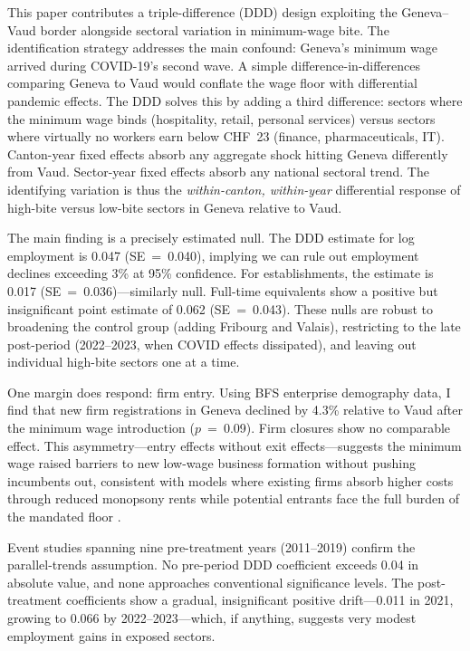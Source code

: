 \documentclass[12pt]{article}
\begin{document}
This paper contributes a triple-difference (DDD) design exploiting the Geneva--Vaud border alongside sectoral variation in minimum-wage bite. The identification strategy addresses the main confound: Geneva's minimum wage arrived during COVID-19's second wave. A simple difference-in-differences comparing Geneva to Vaud would conflate the wage floor with differential pandemic effects. The DDD solves this by adding a third difference: sectors where the minimum wage binds (hospitality, retail, personal services) versus sectors where virtually no workers earn below CHF~23 (finance, pharmaceuticals, IT). Canton-year fixed effects absorb any aggregate shock hitting Geneva differently from Vaud. Sector-year fixed effects absorb any national sectoral trend. The identifying variation is thus the \textit{within-canton, within-year} differential response of high-bite versus low-bite sectors in Geneva relative to Vaud.

The main finding is a precisely estimated null. The DDD estimate for log employment is 0.047 (SE~=~0.040), implying we can rule out employment declines exceeding 3\% at 95\% confidence. For establishments, the estimate is 0.017 (SE~=~0.036)---similarly null. Full-time equivalents show a positive but insignificant point estimate of 0.062 (SE~=~0.043). These nulls are robust to broadening the control group (adding Fribourg and Valais), restricting to the late post-period (2022--2023, when COVID effects dissipated), and leaving out individual high-bite sectors one at a time.

One margin does respond: firm entry. Using BFS enterprise demography data, I find that new firm registrations in Geneva declined by 4.3\% relative to Vaud after the minimum wage introduction ($p$~=~0.09). Firm closures show no comparable effect. This asymmetry---entry effects without exit effects---suggests the minimum wage raised barriers to new low-wage business formation without pushing incumbents out, consistent with models where existing firms absorb higher costs through reduced monopsony rents while potential entrants face the full burden of the mandated floor \citep{azar2022}.

Event studies spanning nine pre-treatment years (2011--2019) confirm the parallel-trends assumption. No pre-period DDD coefficient exceeds 0.04 in absolute value, and none approaches conventional significance levels. The post-treatment coefficients show a gradual, insignificant positive drift---0.011 in 2021, growing to 0.066 by 2022--2023---which, if anything, suggests very modest employment gains in exposed sectors.
\end{document}
